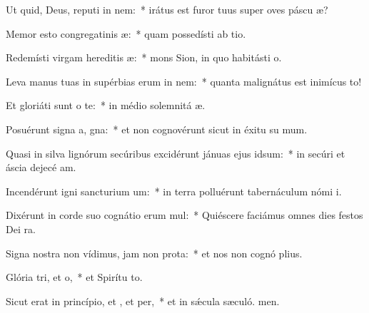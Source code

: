 \item Ut quid, Deus, reputi in nem:~* irátus est furor tuus super oves páscu æ?
\item Memor esto congregatinis æ:~* quam possedísti ab tio.
\item Redemísti virgam hereditis æ:~* mons Sion, in quo habitásti  o.
\item Leva manus tuas in supérbias erum in nem:~* quanta malignátus est inimícus  to!
\item Et gloriáti sunt  o te:~* in médio solemnitá æ.
\item Posuérunt signa a, gna:~* et non cognovérunt sicut in éxitu su mum.
\item Quasi in silva lignórum secúribus excidérunt jánuas ejus  idsum:~* in secúri et áscia dejecé am.
\item Incendérunt igni sancturium um:~* in terra polluérunt tabernáculum nómi i.
\item Dixérunt in corde suo cognátio erum mul:~* Quiéscere faciámus omnes dies festos Dei  ra.
\item Signa nostra non vídimus, jam non  prota:~* et nos non cognó plius.
\item Glória tri, et o,~* et Spirítu to.
\item Sicut erat in princípio, et , et per,~* et in sǽcula sæculó. men.
